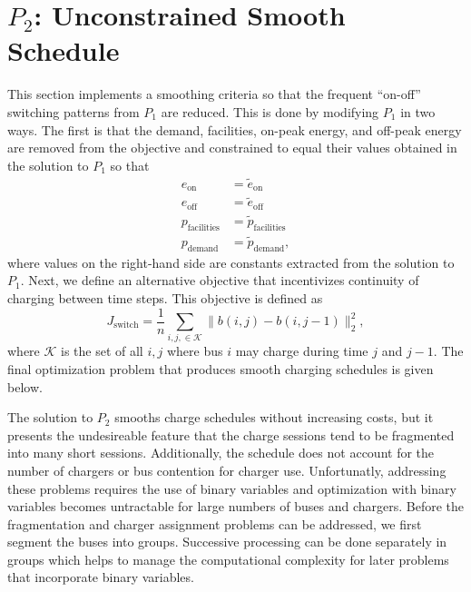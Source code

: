 \section{$P_2$: Unconstrained Smooth Schedule \label{sec:unconstrainedSmoothSchedule}} 
\par This section implements a smoothing criteria so that the frequent ``on-off'' switching patterns from $P_1$ are reduced. This is done by modifying $P_1$ in two ways. The first is that the demand, facilities, on-peak energy, and off-peak energy are removed from the objective and constrained to equal their values obtained in the solution to $P_1$ so that
\begin{equation}\label{eqn:unconstrainedSmooth:equivalence}\begin{aligned}
	e_{\text{on}} &= \tilde{e}_{\text{on}} \\
	e_{\text{off}} &= \tilde{e}_{\text{off}} \\
	p_{\text{facilities}} &= \tilde{p}_{\text{facilities}} \\
	p_{\text{demand}} &= \tilde{p}_{\text{demand}},
\end{aligned}\end{equation}
where values on the right-hand side are constants extracted from the solution to $P_1$.
Next, we define an alternative objective that incentivizes continuity of charging between time steps. This objective is defined as
\begin{equation}\label{eqn:objective:smooth}
	J_{\text{switch}} = \frac{1}{n}\sum_{i,j, \in \mathcal{K}}\lVert b(i,j) - b(i,j-1) \rVert^2_2,
\end{equation}
where $\mathcal{K}$ is the set of all $i,j$ where bus $i$ may charge during time $j$ and $j - 1$.  The final optimization problem that produces smooth charging schedules is given below.\\[0.1in]
\par The solution to $P_2$ smooths charge schedules without increasing costs, but it presents the undesireable feature that the charge sessions tend to be fragmented into many short sessions. Additionally, the schedule does not account for the number of chargers or bus contention for charger use. Unfortunatly, addressing these problems requires the use of binary variables and optimization with binary variables becomes untractable for large numbers of buses and chargers. Before the fragmentation and charger assignment problems can be addressed, we first segment the buses into groups.  Successive processing can be done separately in groups which helps to manage the computational complexity for later problems that incorporate binary variables.

